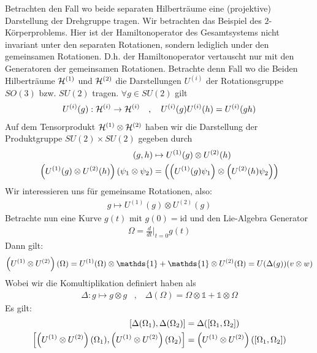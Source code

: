 Betrachten den Fall wo beide separaten Hilberträume eine (projektive) Darstellung
der Drehgruppe tragen. Wir betrachten das Beispiel des $2$-Körperproblems. Hier
ist der Hamiltonoperator des Gesamtsystems nicht invariant unter den separaten
Rotationen, sondern lediglich under den gemeinsamen Rotationen. D.h. der
Hamiltonoperator vertauscht nur mit den Generatoren der gemeinsamen Rotationen.
Betrachte denn Fall wo die Beiden Hilberträume $\mathcal{H}^{(1)}$ und $\mathcal{H}^{(2)}$ die
Darstellungen $U^{(i)}$ der Rotationsgruppe $SO(3)$ bzw. $SU(2)$ tragen.
$\forall g \in SU(2)$ gilt
\begin{align*}
    U^{(i)} (g) : \mathcal{H}^{(i)} \rightarrow \mathcal{H}^{(i)}
    \hspace{10pt} , \hspace{10pt}
    U^{(i)}(g) U^{(i)}(h) = U^{(i)} (gh)
\end{align*}
Auf dem Tensorprodukt $\mathcal{H}^{(1)} \otimes \mathcal{H}^{(2)}$ haben wir die Darstellung der
Produktgruppe $SU(2) \times SU(2)$ gegeben durch
\begin{align*}
    (g,h) &\mapsto U^{(1)} (g) \otimes U^{(2)} (h)
    \\
    \left( U^{(1)} (g) \otimes U^{(2)} (h) \right) (\psi_1 \otimes \psi_2)
    &= \left( \left( U^{(1)} (g) \psi_1 \right) \otimes \left( U^{(2)} (h) \psi_2 \right) \right)
\end{align*}
Wir interessieren uns für gemeinsame Rotationen, also:
\begin{align*}
    g \mapsto U^{(1)} (g) \otimes U^{(2)} (g)
\end{align*}
Betrachte nun eine Kurve $g(t)$ mit $g(0) = \text{id}$ und den Lie-Algebra Generator
\begin{align*}
    \Omega = \frac{d}{dt}\Big|_{t=0} g(t) 
\end{align*}
Dann gilt:
\begin{align*}
    \klammer{U^{(1)} \otimes U^{(2)}}(\Omega)
    = U^{(1)} (\Omega) \otimes \mathds{1} + \mathds{1} \otimes U^{(2)} (\Omega)
    = U(\Delta (g)) (v \otimes w)
\end{align*}
Wobei wir die Komultiplikation definiert haben als
\begin{align*}
    \Delta : g \mapsto g \otimes g
    \hspace{10pt} , \hspace{10pt}
    \Delta(\Omega) = \Omega \otimes \mathds{1} + \mathds{1} \otimes \Omega
\end{align*}
Es gilt:
\begin{align*}
    \left[ \Delta(\Omega_1),\Delta(\Omega_2) \right] &= \Delta(\left[ \Omega_1,\Omega_2 \right])
    \\
    \left[ \left( U^{(1)} \otimes U^{(2)} \right) (\Omega_1) , \left( U^{(1)} \otimes U^{(2)} \right) (\Omega_2) \right]
    &= \left( U^{(1)} \otimes U^{(2)} \right) \left( \left[ \Omega_1 , \Omega_2 \right] \right)
\end{align*}

